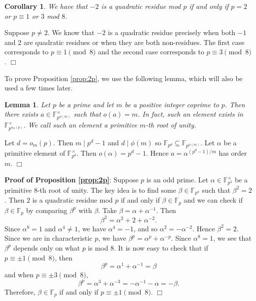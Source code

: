 \documentclass{article}
\def\F{{\mathbb F}}
\def\F{{\mathbb F}}
\newtheorem{cor}[subsection]{Corollary}
\newtheorem{lemma}[subsection]{Lemma}
\newenvironment{proof}{\noindent {\bf Proof:}}{$\Box$ \vspace{2 ex}}
\begin{document}
\begin{cor}
    We have that $-2$ is a quadratic residue mod $p$ if and only if $p = 2$ or $p\equiv 1$ or $3$ mod $8$.
\end{cor}

\begin{proof}
    Suppose $p\neq 2$. We know that $-2$ is a quadratic residue precisely when both $-1$ and $2$ are quadratic residues or when they are both non-residues. The first case corresponds to $p\equiv 1\pmod{8}$ and the second case corresponds to $p\equiv 3\pmod{8}$.
\end{proof}

To prove Proposition \ref{prop:2p}, we use the following lemma, which will also be used a few times later.

\begin{lemma}
    Let $p$ be a prime and let $m$ be a positive integer coprime to $p$. Then there exists $a\in\F_{p^{\phi(m)}}^\times$ such that $o(a) = m$. In fact, such an element exists in $\F_{p^{o_m(p)}}^\times.$ We call such an element a primitive $m$-th root of unity.
\end{lemma}

\begin{proof}
    Let $d = o_m(p)$. Then $m\mid p^d - 1$ and $d\mid \phi(m)$ so $\F_{p^d}\subseteq\F_{p^{\phi(m)}}.$ Let $\alpha$ be a primitive element of $\F_{p^d}^\times$. Then $o(\alpha) = p^{d} - 1$. Hence $a = \alpha^{(p^{d}-1)/m}$ has order $m$.
\end{proof}

\noindent\textbf{Proof of Proposition \ref{prop:2p}}: Suppose $p$ is an odd prime. Let $\alpha\in\F_{p^4}^\times$ be a primitive $8$-th root of unity. The key idea is to find some $\beta\in\F_{p^4}$ such that $\beta^2 = 2$. Then $2$ is a quadratic residue mod $p$ if and only if $\beta\in\F_p$ and we can check if $\beta\in\F_p$ by comparing $\beta^p$ with $\beta.$ Take $\beta = \alpha + \alpha^{-1}$. Then
$$\beta^2 = \alpha^2 + 2 + \alpha^{-2}.$$ Since $\alpha^8 = 1$ and $\alpha^4\neq 1$, we have $\alpha^4 = -1$, and so $\alpha^2 = -\alpha^{-2}$. Hence $\beta^2 = 2$.
Since we are in characteristic $p$, we have $\beta^p = \alpha^p + \alpha^{-p}$. Since $\alpha^8 = 1$, we see that $\beta^p$ depends only on what $p$ is mod $8$. It is now easy to check that if $p\equiv \pm1\pmod{8}$, then
$$\beta^p = \alpha^1 + \alpha^{-1} = \beta$$
and when $p\equiv \pm3\pmod{8}$, 
$$\beta^p = \alpha^3 + \alpha^{-3} = -\alpha^{-1} - \alpha = -\beta.$$
Therefore, $\beta\in\F_p$ if and only if $p\equiv \pm 1\pmod{8}$. \hspace{20pt} $\Box$
\end{document}
